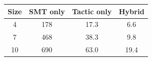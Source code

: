 \documentclass[runningheads]{llncs}
\newcommand\fstar{F$^\star$\xspace}
\newcommand{\comm}[3]{\ifcheckpagebudget\else\ifdraft{{\color{#1}[#2: #3]}}\fi\fi}
\newcommand{\ch}[1]{\comm{teal}{CH}{#1}}
\newcommand{\guido}[1]{\comm{blue}{Guido}{#1}}
\begin{document}






\begin{figure}
    \small
    \vspace{-7mm}
    \begin{tabular}{|c||c|c|c|}
        \hline
                       Size           & SMT only & Tactic only & Hybrid \\
        \hline
                         4            & 178      & 17.3        & 6.6    \\
                         7            & 468      & 38.3        & 9.8    \\
                        10            & 690      & 63.0        & 19.4   \\ \hline
    \end{tabular}
    \vspace{-8mm}
\end{figure}
\end{document}
